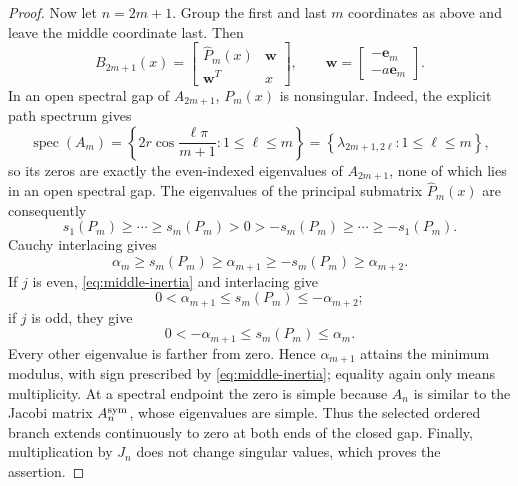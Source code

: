 \documentclass[review,hidelinks,onefignum,onetabnum]{siamart251216}
\begin{document}
\begin{proof}
Now let \(n=2m+1\).  Group the first and last \(m\) coordinates as
above and leave the middle coordinate last.  Then
\begin{equation}\label{eq:odd-dilation}
 B_{2m+1}(x)=
 \begin{bmatrix}\widehat P_m(x)&\boldsymbol w\\\boldsymbol w^T&x\end{bmatrix},
 \qquad
 \boldsymbol w=\begin{bmatrix}-\mathbf e_m\\-a\mathbf e_m\end{bmatrix}.
\end{equation}
In an open spectral gap of \(A_{2m+1}\), \(P_m(x)\) is nonsingular.  Indeed,
the explicit path spectrum gives
\[
 \operatorname{spec}(A_m)
 =\left\{2r\cos\frac{\ell\pi}{m+1}:1\leq\ell\leq m\right\}
 =\left\{\lambda_{2m+1,2\ell}:1\leq\ell\leq m\right\},
\]
so its zeros are exactly the even-indexed eigenvalues of \(A_{2m+1}\), none
of which lies in an open spectral gap.
The eigenvalues of the principal submatrix \(\widehat P_m(x)\) are
consequently
\[
 s_1(P_m)\geq\cdots\geq s_m(P_m)>0>
 -s_m(P_m)\geq\cdots\geq-s_1(P_m).
\]
Cauchy interlacing gives
\[
 \alpha_m\geq s_m(P_m)\geq\alpha_{m+1}
 \geq-s_m(P_m)\geq\alpha_{m+2}.
\]
If \(j\) is even, \eqref{eq:middle-inertia} and interlacing give
\[
 0<\alpha_{m+1}\leq s_m(P_m)\leq-\alpha_{m+2};
\]
if \(j\) is odd, they give
\[
 0<-\alpha_{m+1}\leq s_m(P_m)\leq\alpha_m.
\]
Every other eigenvalue is farther from zero.  Hence
\(\alpha_{m+1}\) attains the minimum modulus, with sign prescribed by
\eqref{eq:middle-inertia}; equality again only means multiplicity.  At a
spectral endpoint the zero is simple because \(A_n\) is similar to the
Jacobi matrix \(A_n^{\rm sym}\), whose eigenvalues are simple.  Thus the selected
ordered branch extends continuously to zero at both ends of the closed
gap.  Finally, multiplication by \(J_n\) does not change singular
values, which proves the assertion.
\end{proof}
\end{document}
